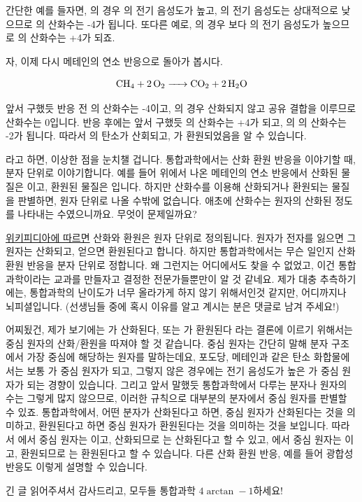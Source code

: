 \documentclass{article}
\begin{document}
간단한 예를 들자면, 의 경우 의 전기 음성도가 높고, 의 전기 음성도는 상대적으로 낮으므로 의 산화수는 -4가 됩니다. 또다른 예로, 의 경우 보다 의 전기 음성도가 높으므로 의 산화수는 +4가 되죠. \newline

자, 이제 다시 메테인의 연소 반응으로 돌아가 봅시다.

\[
    \ce{CH_4 + 2O_2 -> CO_2 + 2H_2O}
\]

앞서 구했듯 반응 전 의 산화수는 -4이고, 의 경우 산화되지 않고 공유 결합을 이루므로 산화수는 0입니다. 반응 후에는 앞서 구했듯 의 산화수는 +4가 되고, 의 의 산화수는 -2가 됩니다. 따라서 의 탄소가 산회되고, 가 환원되었음을 알 수 있습니다. \newline

라고 하면, 이상한 점을 눈치챌 겁니다. 통합과학에서는 산화 환원 반응을 이야기할 때, 분자 단위로 이야기합니다. 예를 들어 위에서 나온 메테인의 연소 반응에서 산화된 물질은 이고, 환원된 물질은 입니다. 하지만 산화수를 이용해 산화되거나 환원되는 물질을 판별하면, 원자 단위로 나올 수밖에 없습니다. 애초에 산화수는 원자의 산화된 정도를 나타내는 수였으니까요. 무엇이 문제일까요? \newline

\href{https://en.wikipedia.org/wiki/Redox}{위키피디아에 따르면} 산화와 환원은 원자 단위로 정의됩니다. 원자가 전자를 잃으면 그 원자는 산화되고, 얻으면 환원된다고 합니다. 하지만 통합과학에서는 무슨 일인지 산화 환원 반응을 분자 단위로 정합니다. 왜 그런지는 어디에서도 찾을 수 없었고, 이건 통합과학이라는 교과를 만들자고 결정한 전문가들뿐만이 알 것 같네요. 제가 대충 추측하기에는, 통합과학의 난이도가 너무 올라가게 하지 않기 위해서인것 같지만, 어디까지나 뇌피셜입니다. (선생님들 중에 혹시 이유를 알고 계시는 분은 댓글로 남겨 주세요!) \newline

어찌됬건, 제가 보기에는 가 산화된다, 또는 가 환원된다 라는 결론에 이르기 위해서는 중심 원자의 산화/환원을 따져야 할 것 같습니다. 중심 원자는 간단히 말해 분자 구조에서 가장 중심에 해당하는 원자를 말하는데요, 포도당, 메테인과 같은 탄소 화합물에서는 보통 가 중심 원자가 되고, 그렇지 않은 경우에는 전기 음성도가 높은 가 중심 원자가 되는 경향이 있습니다. 그리고 앞서 말했듯 통합과학에서 다루는 분자나 원자의 수는 그렇게 많지 않으므로, 이러한 규칙으로 대부분의 분자에서 중심 원자를 판별할 수 있죠. 통합과학에서, 어떤 분자가 산화된다고 하면, 중심 원자가 산화된다는 것을 의미하고, 환원된다고 하면 중심 원자가 환원된다는 것을 의미하는 것을 보입니다. 따라서 에서 중심 원자는 이고, 산화되므로 는 산화된다고 할 수 있고, 에서 중심 원자는 이고, 환원되므로 는 환원된다고 할 수 있습니다. 다른 산화 환원 반응, 예를 들어 광합성 반응도 이렇게 설명할 수 있습니다. \newline

긴 글 읽어주셔서 감사드리고, 모두들 통합과학 $4\arctan -1$하세요!
\end{document}

